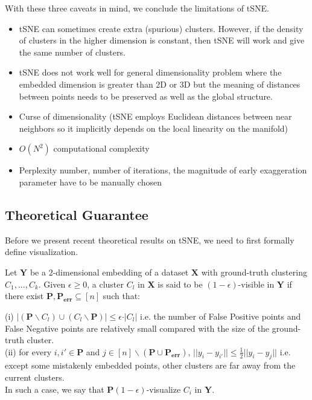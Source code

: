 With these three caveats in mind, we conclude the limitations of tSNE.
\begin{itemize}
  \item tSNE can sometimes create extra (spurious) clusters. However,
    if the density of clusters in the higher dimension is constant, then
    tSNE will work and give the same number of clusters.
  \item tSNE does not work well for general dimensionality problem
    where the embedded dimension is greater than 2D or 3D but the
    meaning of distances between points needs to be preserved as well
    as the global structure. 
  \item Curse of dimensionality (tSNE employs Euclidean distances
    between near neighbors so it implicitly depends on the local
    linearity on the manifold) 
  \item $O(N^2)$ computational complexity
  \item Perplexity number, number of iterations, the magnitude of
    early exaggeration parameter have to be manually chosen 
\end{itemize}

\newpage
\subsection{Theoretical Guarantee}
Before we present recent theoretical results on tSNE, we need to first
formally define visualization. 
\begin{definition}
    Let $\mathbf{Y}$ be a 2-dimensional embedding of a dataset
    $\mathbf{X}$ with ground-truth clustering $C_1,...,C_k$. Given
    $\epsilon \geq 0$, a cluster $C_l$ in $\mathbf{X}$ is said to be
    $(1-\epsilon)$-visible in $\mathbf{Y}$ if there exist $\mathbf{P},
    \mathbf{P_{err}} \subseteq [n]$ such that: 

    \indent (i) $\vert (\mathbf{P}\backslash C_l) \cup (C_l \backslash
    \mathbf{P}) \vert \leq \epsilon \cdot \vert C_l \vert$ i.e. the
    number of False Positive points and False Negative points are
    relatively small compared with the size of the ground-truth
    cluster.\\ 
    \indent (ii) for every $i,i' \in \mathbf{P}$ and $j \in [n]
    \backslash (\mathbf{P} \cup \mathbf{P_{err}})$, $\vert \vert y_i -
    y_{i'} \vert \vert \leq \frac{1}{2} \vert \vert y_i - y_j \vert
    \vert$ i.e. except some mistakenly embedded points, other clusters
    are far away from the current clusters.\\ 
    In such a case, we say that $\mathbf{P}(1-\epsilon)$-visualize
    $C_i$ in $\mathbf{Y}$. 
\end{definition}

